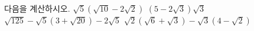 다음을 계산하시오.
 $\sqrt{5}(\sqrt{10}-2\sqrt{2})$
 $(5-2\sqrt{3})\sqrt{3}$
 $\sqrt{125}-\sqrt{5}(3+\sqrt{20})-2\sqrt{5}$
 $\sqrt{2}(\sqrt{6}+\sqrt{3})-\sqrt{3}(4-\sqrt{2})$
